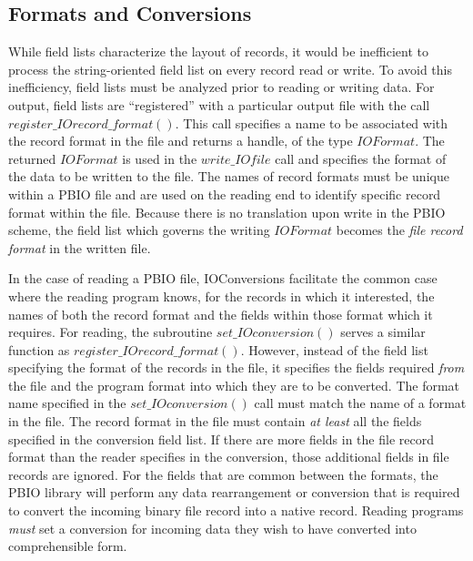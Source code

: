 \documentclass{article}
\begin{document}
\subsection{Formats and Conversions}

While field lists characterize the layout of records, it would be inefficient
to process the string-oriented field list on every record read or write.  To
avoid this inefficiency, field lists must be analyzed prior to reading or
writing data.  For output, field lists are ``registered'' with a particular
output file with the call $register\_IOrecord\_format()$.  This call specifies
a name to be associated with the record format in the file and returns a
handle, of the type $IOFormat$.  The returned $IOFormat$ is used in the 
$write\_IOfile$ call and specifies the format of the data to be written to the
file.  The names of record formats must be unique within a PBIO file and are
used on the reading end to identify specific record format within the file.
Because there is no translation upon write in the PBIO scheme, the field list
which governs the writing $IOFormat$ becomes the {\it file record format} in
the written file.

In the case of reading a PBIO file, IOConversions facilitate the common case
where the reading program knows, for the records in which it interested, the
names of both the record format and the fields within those format which it
requires.  For reading, the subroutine $set\_IOconversion()$ serves a
similar function as $register\_IOrecord\_format()$.  However, instead of
the field list specifying the format of the records in the file, it specifies
the fields required {\it from} the file and the program format into which they
are to be converted.  The format name specified in the
$set\_IOconversion()$ call must match the name of a format in the file.
The record format in the file must contain {\it at least} all the fields
specified in the conversion field list.  If there are more fields in the file
record format than the reader specifies in the conversion, those additional
fields in file records are ignored.  For the fields that are common between
the formats, the PBIO library will perform any data rearrangement or conversion
that is required to convert the incoming binary file record into a native
record.  Reading programs {\it must} set a conversion for incoming data they
wish to have converted into comprehensible form.  
\end{document}
